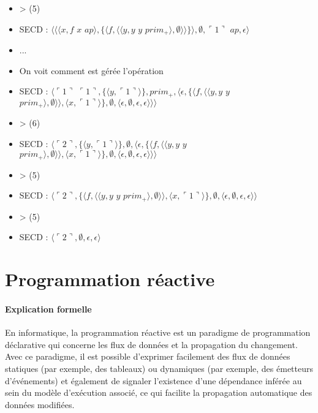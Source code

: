 \documentclass[10pt,a4paper]{report}
\begin{document}
\begin{itemize}
\item[] > (5)
\item[] SECD : $\langle\langle\langle x,f$ $x$ $ap\rangle,\{\langle f,\langle\langle y,y$ $y$ $prim_{+}\rangle,\emptyset\rangle\rangle\}\rangle,\emptyset,\ulcorner 1\urcorner$ $ap,\epsilon\rangle$
\item[] ...
\item[] On voit comment est gérée l'opération
\item[] SECD : $\langle\ulcorner 1\urcorner$ $\ulcorner 1\urcorner,\{\langle y,\ulcorner 1\urcorner\rangle\},prim_{+},\langle\epsilon,\{\langle f,\langle\langle y,y$ $y$ $prim_{+}\rangle,\emptyset\rangle\rangle,\langle x,\ulcorner 1\urcorner\rangle\} ,\emptyset,\langle\epsilon,\emptyset,\epsilon,\epsilon\rangle\rangle\rangle$
\item[] > (6)
\item[] SECD : $\langle\ulcorner 2\urcorner,\{\langle y,\ulcorner 1\urcorner\rangle\},\emptyset,\langle\epsilon,\{\langle f,\langle\langle y,y$ $y$ $prim_{+}\rangle,\emptyset\rangle\rangle,\langle x,\ulcorner 1\urcorner\rangle\} ,\emptyset,\langle\epsilon,\emptyset,\epsilon,\epsilon\rangle\rangle\rangle$
\item[] > (5)
\item[] SECD : $\langle\ulcorner 2\urcorner,\{\langle f,\langle\langle y,y$ $y$ $prim_{+}\rangle,\emptyset\rangle\rangle,\langle x,\ulcorner 1\urcorner\rangle\} ,\emptyset,\langle\epsilon,\emptyset,\epsilon,\epsilon\rangle\rangle$
\item[] > (5)
\item[] SECD : $\langle\ulcorner 2\urcorner,\emptyset,\epsilon,\epsilon\rangle$
\end{itemize}


\section{Programmation réactive}


\paragraph{Explication formelle}
En informatique, la programmation réactive est un paradigme de programmation déclarative qui concerne les flux de données et la propagation du changement. Avec ce paradigme, il est possible d’exprimer facilement des flux de données statiques (par exemple, des tableaux) ou dynamiques (par exemple, des émetteurs d’événements) et également de signaler l’existence d’une dépendance inférée au sein du modèle d’exécution associé, ce qui facilite la propagation automatique des données modifiées.
\medbreak
\end{document}
